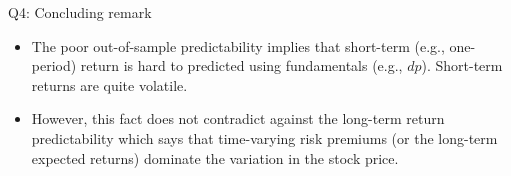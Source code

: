 \documentclass[10pt,t]{beamer}
\begin{document}
\begin{frame}{Q4: Concluding remark}
\begin{itemize}
  \item The poor out-of-sample predictability implies that short-term (e.g., one-period) return is hard to predicted using fundamentals (e.g., $dp$). Short-term returns are quite volatile.
  \item However, this fact does not contradict against the long-term return predictability which says that time-varying risk premiums (or the long-term expected returns) dominate the variation in the stock price.
\end{itemize}
\end{frame}
\end{document}
